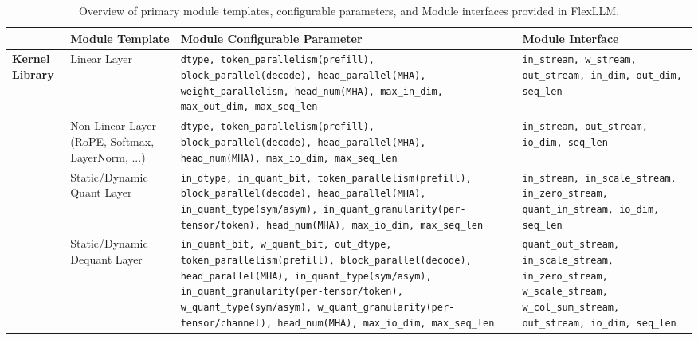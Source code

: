 \documentclass[conference]{IEEEtran}
\begin{document}
\begin{table}[t]
\centering
\scriptsize
\caption{Overview of primary module templates, configurable parameters, and Module interfaces provided in FlexLLM.}
\vspace{-0.2cm}
\renewcommand{\arraystretch}{1.1}
\setlength{\tabcolsep}{3.4pt}
\begin{tabular}{m{1cm}|m{1.8cm}|m{9.4cm}|m{4.8cm}}
\hline
 & \textbf{Module Template} & \textbf{Module Configurable Parameter} & \textbf{Module Interface} \\
\hline
\multirow{3}{=}{\raggedright\arraybackslash \textbf{Kernel Library}} 
& Linear Layer & 
\texttt{dtype, token\_parallelism(prefill), block\_parallel(decode), head\_parallel(MHA), weight\_parallelism, head\_num(MHA), max\_in\_dim, max\_out\_dim, max\_seq\_len} &
\texttt{in\_stream, w\_stream, out\_stream, in\_dim, out\_dim, seq\_len} \\
\cline{2-4}
& Non-Linear Layer (RoPE, Softmax, LayerNorm, ...) &
\texttt{dtype, token\_parallelism(prefill), block\_parallel(decode), head\_parallel(MHA), head\_num(MHA), max\_io\_dim, max\_seq\_len} &
\texttt{in\_stream, out\_stream, io\_dim, seq\_len} \\
\hline
\multirow{3}{=}{\raggedright\arraybackslash \textbf{Quant Library}}
& Static/Dynamic Quant Layer &
\texttt{in\_dtype, in\_quant\_bit, token\_parallelism(prefill), block\_parallel(decode), head\_parallel(MHA), in\_quant\_type(sym/asym), in\_quant\_granularity(per-tensor/token), head\_num(MHA), max\_io\_dim, max\_seq\_len} &
\texttt{in\_stream, in\_scale\_stream, in\_zero\_stream, quant\_in\_stream, io\_dim, seq\_len} \\
\cline{2-4}
& Static/Dynamic Dequant Layer &
\texttt{in\_quant\_bit, w\_quant\_bit, out\_dtype, token\_parallelism(prefill), block\_parallel(decode), head\_parallel(MHA), in\_quant\_type(sym/asym), in\_quant\_granularity(per-tensor/token), w\_quant\_type(sym/asym), w\_quant\_granularity(per-tensor/channel), head\_num(MHA), max\_io\_dim, max\_seq\_len} &
\texttt{quant\_out\_stream, in\_scale\_stream, in\_zero\_stream, w\_scale\_stream, w\_col\_sum\_stream, out\_stream, io\_dim, seq\_len} \\
\hline
\end{tabular}
\label{tab:module_template}
\vspace{-0.4cm}
\end{table}
\end{document}

